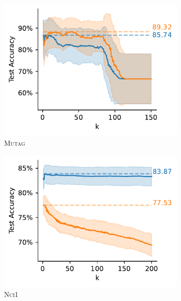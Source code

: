 \begin{figure}[H]
\begin{subfigure}[b]{0.3\textwidth}
		\centering
		\includegraphics[width=\textwidth]{Figures/knn_MUTAG.pdf}
		\vspace*{-4ex} 
		\caption{\textsc{Mutag}}
	\end{subfigure}
	\par\bigskip
	\begin{subfigure}[b]{0.3\textwidth}
		\centering
		\includegraphics[width=\textwidth]{Figures/knn_NCI1.pdf}
		\vspace*{-4ex} 
		\caption{\textsc{Nci1}}
	\end{subfigure}
	\hfill
	\begin{subfigure}[b]{0.3\textwidth}
		\centering

\end{subfigure}
\end{figure}
